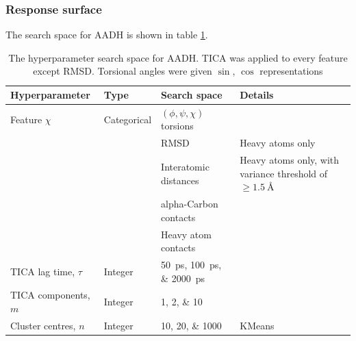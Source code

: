 \subsubsection{Response surface}

The search space for AADH is shown in table \ref{tab:aadh_searchspace}. 

\begin{table}
    \caption{The hyperparameter search space for AADH. TICA was applied to every feature except RMSD. Torsional angles were given $\sin$, $\cos$ representations}
    \centering
    \begin{tabularx}{0.9\textwidth}{ |>{\raggedright\arraybackslash}l|l|>{\raggedright\arraybackslash}X| >{\raggedright\arraybackslash}X | } 
    \hline
    \textbf{Hyperparameter} & \textbf{Type} & \textbf{Search space} & \textbf{Details} \\
     \hline\hline
    Feature $\chi$ & Categorical & $(\phi, \psi, \chi)$ torsions &  \\
    & & RMSD &  Heavy atoms only\\ 
    & & Interatomic distances & Heavy atoms only, with variance threshold of $\ge\SI{1.5}{\angstrom}$ \\
    & & alpha-Carbon contacts & \\ 
    & & Heavy atom contacts & \\ 

    \hline
    TICA lag time, $\tau$ & Integer &\SIlist[list-final-separator = { ... }]{50;100;2000}{ps} & \\
    \hline
    TICA components, $m$& Integer &\numlist[list-final-separator = { ... }]{1;2;10} & \\
    \hline
    Cluster centres, $n$ & Integer & \numlist[list-final-separator = { ... }]{10;20;1000} &  KMeans \\
    
     \hline
    \end{tabularx}
    \label{tab:aadh_searchspace}
\end{table}



